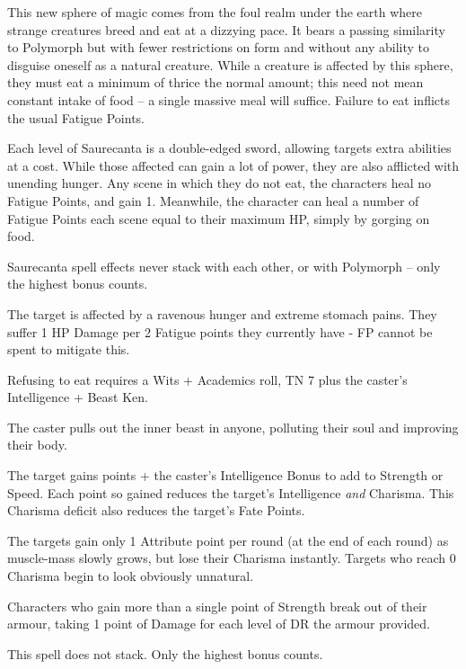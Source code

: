 \begin{multicols}{2}

This new sphere of magic comes from the foul realm under the earth where strange creatures breed and eat at a dizzying pace.
It bears a passing similarity to Polymorph but with fewer restrictions on form and without any ability to disguise oneself as a natural creature.
While a creature is affected by this sphere, they must eat a minimum of thrice the normal amount; this need not mean constant intake of food -- a single massive meal will suffice.
Failure to eat inflicts the usual Fatigue Points.

Each level of Saurecanta is a double-edged sword, allowing targets extra abilities at a cost.
While those affected can gain a lot of power, they are also afflicted with unending hunger.
Any scene in which they do not eat, the characters heal no Fatigue Points, and gain 1.
Meanwhile, the character can heal a number of Fatigue Points each scene equal to their maximum HP, simply by gorging on food.

Saurecanta spell effects never stack with each other, or with Polymorph -- only the highest bonus counts.

\spelllevel \label{saurecantaone}
The target is affected by a ravenous hunger and extreme stomach pains.  They suffer 1 HP Damage per 2 Fatigue points they currently have - FP cannot be spent to mitigate this.

Refusing to eat requires a Wits + Academics roll, TN 7 plus the caster's Intelligence + Beast Ken.

\spelllevel
{}
The caster pulls out the inner beast in anyone, polluting their soul and improving their body.

The target gains  points + the caster's Intelligence Bonus to add to Strength or Speed.
Each point so gained reduces the target's Intelligence \emph{and} Charisma.
This Charisma deficit also reduces the target's Fate Points.

The targets gain only 1 Attribute point per round (at the end of each round) as muscle-mass slowly grows, but lose their Charisma instantly.
Targets who reach 0 Charisma begin to look obviously unnatural.

Characters who gain more than a single point of Strength break out of their armour, taking 1 point of Damage for each level of DR the armour provided.

This spell does not stack.
Only the highest bonus counts.


\end{multicols}
